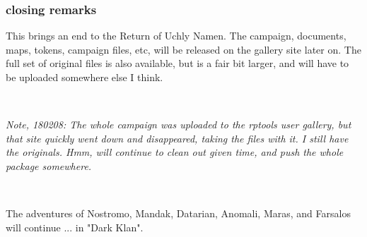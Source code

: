 \subsubsection*{closing remarks}
This brings an end to the Return of Uchly Namen.
The campaign, documents, maps, tokens, campaign files, etc, will be released on the gallery site later on. The full set of original files is also available, but is a fair bit larger, and will have to be uploaded somewhere else I think.

\

\emph{Note, 180208: The whole campaign was uploaded to the rptools user gallery, but that site quickly went down and disappeared, taking the files with it. I still have the originals. Hmm, will continue to clean out given time, and push the whole package somewhere.}

\

The adventures of Nostromo, Mandak, Datarian, Anomali, Maras, and Farsalos will continue ... in "Dark Klan".












